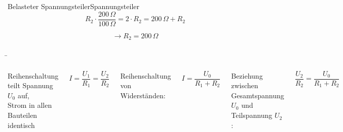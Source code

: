 \begin{frame}
{\begin{bsp}{Belasteter Spannungsteiler}{Spannungsteiler}
	\begin{equation}
		R_2 \cdot \frac{200 \, \Omega}{100 \, \Omega} = 2 \cdot R_2 = 200 \, \Omega + R_2
	\end{equation}

	\begin{equation*}
		\rightarrow R_2 = 200 \, \Omega
	\end{equation*}



\end{bsp}	
	

	
	}
	
	

	\b{

	\begin{columns}


		Reihenschaltung teilt Spannung $U_0$ auf,\\
		Strom in allen Bauteilen identisch

		\begin{equation*}
					I = \frac{U_1}{R_1} = \frac{U_2}{R_2}
		\end{equation*}
		


		

		Reihenschaltung von Widerständen:

		\begin{equation*}
			I = \frac{U_0}{R_1+R_2}
		\end{equation*}

	
	 Beziehung zwischen Gesamtspannung $U_0$ und Teilspannung $U_2$:


	 \begin{equation*}
		\frac{U_2}{R_2} = \frac{U_0}{R_1+R_2}
	 \end{equation*}
		

	

\end{columns}}
\end{frame}
